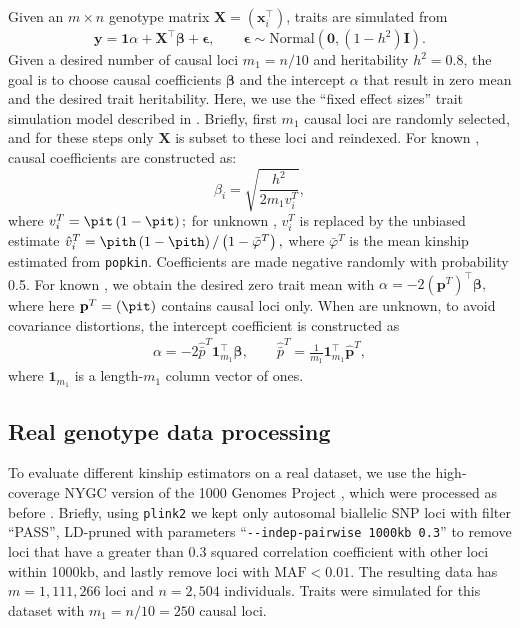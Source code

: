 \documentclass[11pt]{article}
\begin{document}
Given an $m \times n$ genotype matrix $\mathbf{X} = (\mathbf{x}_i^\intercal)$, traits are simulated from
$$
\mathbf{y}
=
\mathbf{1} \alpha + \mathbf{X}^\intercal \boldsymbol{\beta} + \boldsymbol{\epsilon}
, \quad\quad
\boldsymbol{\epsilon} \sim \text{Normal}(\mathbf{0}, (1 - h^2) \mathbf{I})
.
$$
Given a desired number of causal loci $m_1 = n/10$ and heritability $h^2=0.8$, the goal is to choose causal coefficients $\boldsymbol{\beta}$ and the intercept $\alpha$ that result in zero mean and the desired trait heritability.
Here, we use the ``fixed effect sizes'' trait simulation model described in \citep{yao_limitations_2022}.
Briefly, first $m_1$ causal loci are randomly selected, and for these steps only $\mathbf{X}$ is subset to these loci and reindexed.
For known \pit, causal coefficients are constructed as:
$$
\beta_i = \sqrt{ \frac{h^2}{ 2 m_1 v_i^T } },
$$
where
$
v_i^T
=
\pit \left( 1 - \pit \right)
;
$
for unknown \pit,  $v_i^T$ is replaced by the unbiased estimate
$
\hat{v}_i^T
=
\pith \left( 1 - \pith \right) / \left( 1 - \bar{\varphi}^T \right)
,
$
where $\bar{\varphi}^T$ is the mean kinship estimated from \texttt{popkin}.
Coefficients are made negative randomly with probability 0.5.
For known \pit, we obtain the desired zero trait mean with
$
\alpha 
=
- 2 \left( \mathbf{p}^T \right)^\intercal \boldsymbol{\beta}
,
$
where here $\mathbf{p}^T = (\pit)$ contains causal loci only.
When \pit are unknown, to avoid covariance distortions, the intercept coefficient is constructed as
\begin{align*}
  \alpha 
  =
  - 2 \hat{\bar{p}}^T \mathbf{1}_{m_1}^\intercal \boldsymbol{\beta}
  , \quad\quad
  \hat{\bar{p}}^T
  =
  \frac{1}{m_1} \mathbf{1}_{m_1}^\intercal \mathbf{\hat{p}}^T
  ,
\end{align*}
where $\mathbf{1}_{m_1}$ is a length-$m_1$ column vector of ones.

\subsection{Real genotype data processing}

To evaluate different kinship estimators on a real dataset, we use the high-coverage NYGC version of the 1000 Genomes Project \citep{fairley_international_2020}, which were processed as before \citep{yao_limitations_2022}.
Briefly, using \texttt{plink2} \citep{chang_second-generation_2015} we kept only autosomal biallelic SNP loci with filter ``PASS'', LD-pruned with parameters ``\texttt{-{}-indep-pairwise 1000kb 0.3}'' to remove loci that have a greater than 0.3 squared correlation coefficient with other loci within 1000kb, and lastly remove loci with $\text{MAF} < 0.01$.
The resulting data has $m=1,111,266$ loci and $n=2,504$ individuals.
Traits were simulated for this dataset with $m_1 = n/10 = 250$ causal loci.
\end{document}
